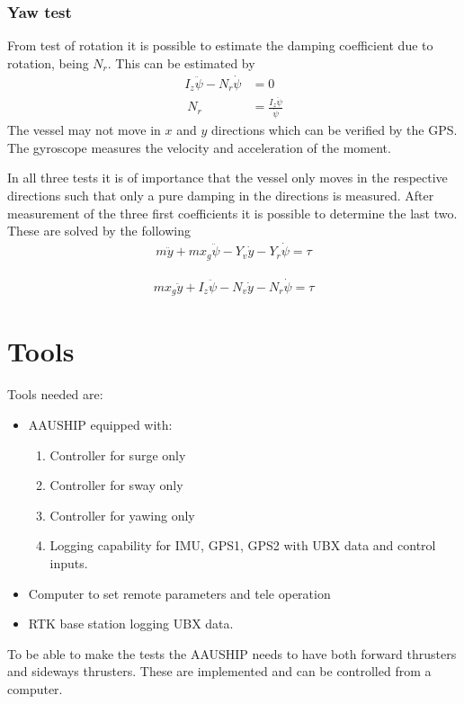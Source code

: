 \subsubsection{Yaw test}
From test of rotation it is possible to estimate the damping coefficient due to rotation, being $N_r$. This can be estimated by
\begin{align}
I_z\ddot \psi - N_r \dot \psi &= 0\\\
N_r &= \frac{I_z \ddot \psi}{\dot \psi}
\end{align}
The vessel may not move in $x$ and $y$ directions which can be verified by the \ac{GPS}. The gyroscope measures the velocity and acceleration of the moment.

In all three tests it is of importance that the vessel only moves in the respective directions such that only a pure damping in the directions is measured. After measurement of the three first coefficients it is possible to determine the last two. These are solved by the following
\begin{align}
m \ddot y + mx_g\ddot\psi - Y_v \dot y - Y_r \dot \psi = \tau
\end{align}

\begin{align}
mx_g \ddot y + I_z\ddot \psi - N_v \dot y - N_r \dot \psi = \tau
\end{align}


\section{Tools}
Tools needed are:
\begin{itemize}
	\item AAUSHIP equipped with:
		\begin{enumerate}
			\item Controller for surge only
			\item Controller for sway only
			\item Controller for yawing only
			\item Logging capability for \ac{IMU}, GPS1, GPS2 with UBX data
				and control inputs.
		\end{enumerate}
	\item Computer to set remote parameters and tele operation
	\item RTK base station logging UBX data.
\end{itemize}
To be able to make the tests the AAUSHIP needs to have both forward thrusters and sideways thrusters. These are implemented and can be controlled from a computer.

